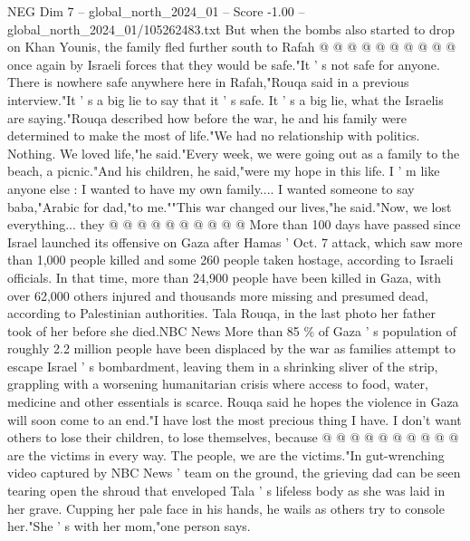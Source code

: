 \begin{textsample}{NEG Dim 7 – global\_north\_2024\_01 – Score -1.00 – global\_north\_2024\_01/105262483.txt}
But when the bombs also started to drop on Khan Younis, the family fled further south to Rafah @ @ @ @ @ @ @ @ @ @ once again by Israeli forces that they would be safe."It ' s not safe for anyone.
There is nowhere safe anywhere here in Rafah,"Rouqa said in a previous interview."It ' s a big lie to say that it ' s safe.
It ' s a big lie, what the Israelis are saying."Rouqa described how before the war, he and his family were determined to make the most of life."We had no relationship with politics.
Nothing.
We loved life,"he said."Every week, we were going out as a family to the beach, a picnic."And his children, he said,"were my hope in this life.
I ' m like anyone else : I wanted to have my own family....
I wanted someone to say baba,"Arabic for dad,"to me.""This war changed our lives,"he said."Now, we lost everything... they @ @ @ @ @ @ @ @ @ @ More than 100 days have passed since Israel launched its offensive on Gaza after Hamas ' Oct. 7 attack, which saw more than 1,000 people killed and some 260 people taken hostage, according to Israeli officials.
In that time, more than 24,900 people have been killed in Gaza, with over 62,000 others injured and thousands more missing and presumed dead, according to Palestinian authorities.
Tala Rouqa, in the last photo her father took of her before she died.NBC News More than 85 \% of Gaza ' s population of roughly 2.2 million people have been displaced by the war as families attempt to escape Israel ' s bombardment, leaving them in a shrinking sliver of the strip, grappling with a worsening humanitarian crisis where access to food, water, medicine and other essentials is scarce.
Rouqa said he hopes the violence in Gaza will soon come to an end."I have lost the most precious thing I have.
I don't want others to lose their children, to lose themselves, because @ @ @ @ @ @ @ @ @ @ are the victims in every way.
The people, we are the victims."In gut-wrenching video captured by NBC News ' team on the ground, the grieving dad can be seen tearing open the shroud that enveloped Tala ' s lifeless body as she was laid in her grave.
Cupping her pale face in his hands, he wails as others try to console her."She ' s with her mom,"one person says.

\end{textsample}
